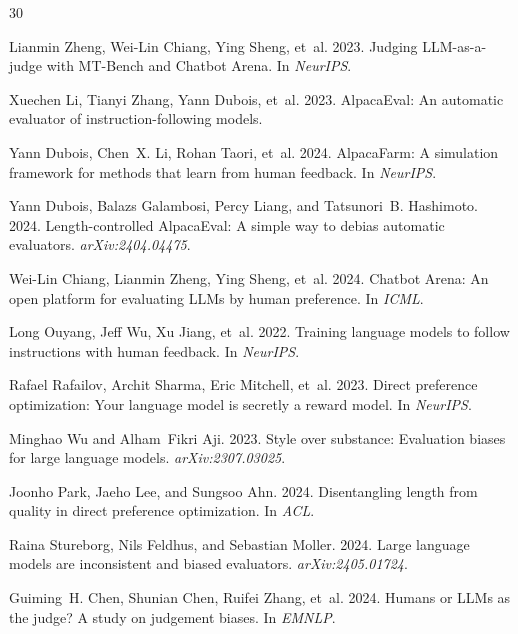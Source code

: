 \documentclass[11pt,a4paper]{article}
\begin{document}
\begin{thebibliography}{30}

Lianmin Zheng, Wei-Lin Chiang, Ying Sheng, et~al. 2023.
Judging LLM-as-a-judge with MT-Bench and Chatbot Arena.
In \emph{NeurIPS}.

Xuechen Li, Tianyi Zhang, Yann Dubois, et~al. 2023.
AlpacaEval: An automatic evaluator of instruction-following models.

Yann Dubois, Chen~X. Li, Rohan Taori, et~al. 2024.
AlpacaFarm: A simulation framework for methods that learn from human feedback.
In \emph{NeurIPS}.

Yann Dubois, Balazs Galambosi, Percy Liang, and Tatsunori~B. Hashimoto. 2024.
Length-controlled AlpacaEval: A simple way to debias automatic evaluators.
\emph{arXiv:2404.04475}.

Wei-Lin Chiang, Lianmin Zheng, Ying Sheng, et~al. 2024.
Chatbot Arena: An open platform for evaluating LLMs by human preference.
In \emph{ICML}.

Long Ouyang, Jeff Wu, Xu Jiang, et~al. 2022.
Training language models to follow instructions with human feedback.
In \emph{NeurIPS}.

Rafael Rafailov, Archit Sharma, Eric Mitchell, et~al. 2023.
Direct preference optimization: Your language model is secretly a reward model.
In \emph{NeurIPS}.

Minghao Wu and Alham~Fikri Aji. 2023.
Style over substance: Evaluation biases for large language models.
\emph{arXiv:2307.03025}.

Joonho Park, Jaeho Lee, and Sungsoo Ahn. 2024.
Disentangling length from quality in direct preference optimization.
In \emph{ACL}.

Raina Stureborg, Nils Feldhus, and Sebastian Moller. 2024.
Large language models are inconsistent and biased evaluators.
\emph{arXiv:2405.01724}.

Guiming~H. Chen, Shunian Chen, Ruifei Zhang, et~al. 2024.
Humans or LLMs as the judge? A study on judgement biases.
In \emph{EMNLP}.


\end{thebibliography}
\end{document}
